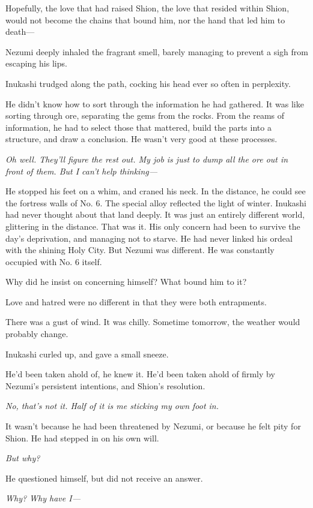 Hopefully, the love that had raised Shion, the love that resided within
Shion, would not become the chains that bound him, nor the hand that led
him to death---

Nezumi deeply inhaled the fragrant smell, barely managing to prevent a
sigh from escaping his lips.

Inukashi trudged along the path, cocking his head ever so often in
perplexity.

He didn't know how to sort through the information he had gathered. It
was like sorting through ore, separating the gems from the rocks. From
the reams of information, he had to select those that mattered, build
the parts into a structure, and draw a conclusion. He wasn't very good
at these processes.

\emph{Oh well. They'll figure the rest out. My job is just to dump all the ore
out in front of them. But I can't help thinking---}

He stopped his feet on a whim, and craned his neck. In the distance, he
could see the fortress walls of No. 6. The special alloy reflected the
light of winter. Inukashi had never thought about that land deeply. It
was just an entirely different world, glittering in the distance. That
was it. His only concern had been to survive the day's deprivation, and
managing not to starve. He had never linked his ordeal with the shining
Holy City. But Nezumi was different. He was constantly occupied with No.
6 itself.

Why did he insist on concerning himself? What bound him to it?

Love and hatred were no different in that they were both entrapments.

There was a gust of wind. It was chilly. Sometime tomorrow, the weather
would probably change.

Inukashi curled up, and gave a small sneeze.

He'd been taken ahold of, he knew it. He'd been taken ahold of firmly by
Nezumi's persistent intentions, and Shion's resolution.

\emph{No, that's not it. Half of it is me sticking my own foot in.}

It wasn't because he had been threatened by Nezumi, or because he felt
pity for Shion. He had stepped in on his own will.

\emph{But why?}

He questioned himself, but did not receive an answer.

\emph{Why? Why have I---}

